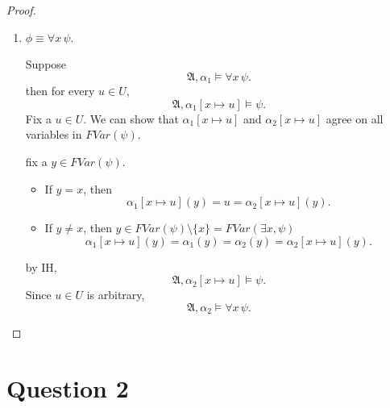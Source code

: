 \documentclass{article}
\begin{document}
\begin{proof}
\begin{enumerate}
    fix a $y\in FVar(\psi)$,

    \begin{itemize}
        \item If $y=x$, then
        \[
        \alpha_1[x\mapsto u](y)=u=\alpha_2[x\mapsto u](y).
        \]

        \item If $y\neq x$, then $y \in FVar(\psi)\setminus\{x\} = FVar(\exists x, \psi)$
        \[
        \alpha_1[x\mapsto u](y)=\alpha_1(y) = \alpha_2(y)=\alpha_2[x\mapsto u](y).
        \]
    \end{itemize}

    Thus, $\forall y\in FVar(\psi)$,
    \[
    \alpha_1[x\mapsto u](y)=\alpha_2[x\mapsto u](y).
    \]
    By IH
    \[
    \mathfrak{A},\alpha_2[x\mapsto u]\models \psi.
    \]
    Hence
    \[
    \mathfrak{A},\alpha_2 \models \exists x\,\psi.
    \]

    \item $\phi \equiv \forall x\,\psi$.

    Suppose
    \[
    \mathfrak{A},\alpha_1 \models \forall x\,\psi.
    \]
    then for every $u\in U$,
    \[
    \mathfrak{A},\alpha_1[x\mapsto u]\models \psi.
    \]
    Fix a $u\in U$. We can show that $\alpha_1[x\mapsto u]$ and $\alpha_2[x\mapsto u]$ agree on all variables in $FVar(\psi)$.

    fix a $y\in FVar(\psi)$.

    \begin{itemize}
        \item If $y=x$, then
        \[
        \alpha_1[x\mapsto u](y)=u=\alpha_2[x\mapsto u](y).
        \]

        \item If $y\neq x$, then $y \in FVar(\psi)\setminus\{x\} = FVar(\exists x, \psi)$
        \[
        \alpha_1[x\mapsto u](y)=\alpha_1(y) = \alpha_2(y)=\alpha_2[x\mapsto u](y).
        \]
    \end{itemize}
    by IH,
    \[
    \mathfrak{A},\alpha_2[x\mapsto u]\models \psi.
    \]
    Since $u\in U$ is arbitrary,
    \[
    \mathfrak{A},\alpha_2 \models \forall x\,\psi.
    \]
\end{enumerate}
\end{proof}

\section*{Question 2}
\end{document}
